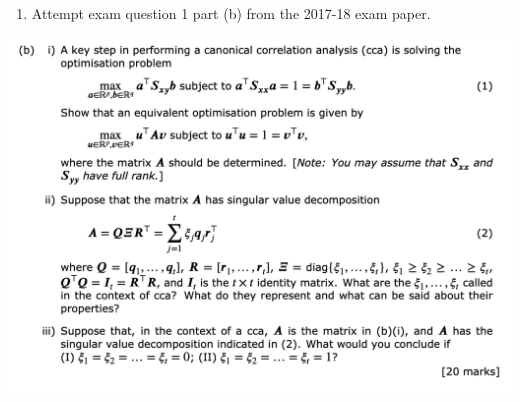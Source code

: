 \documentclass[
]{book}
\providecommand{\tightlist}{%
  \setlength{\itemsep}{0pt}\setlength{\parskip}{0pt}}
\theoremstyle{definition}
\theoremstyle{definition}
\theoremstyle{definition}
\theoremstyle{definition}
\theoremstyle{remark}
\begin{document}
\begin{enumerate}
\def\labelenumi{\arabic{enumi}.}
\setcounter{enumi}{1}
\tightlist
\item
  Attempt exam question 1 part (b) from the 2017-18 exam paper.
\end{enumerate}

\includegraphics{figs/CCA_2017_18_Q1.png}
\end{document}
